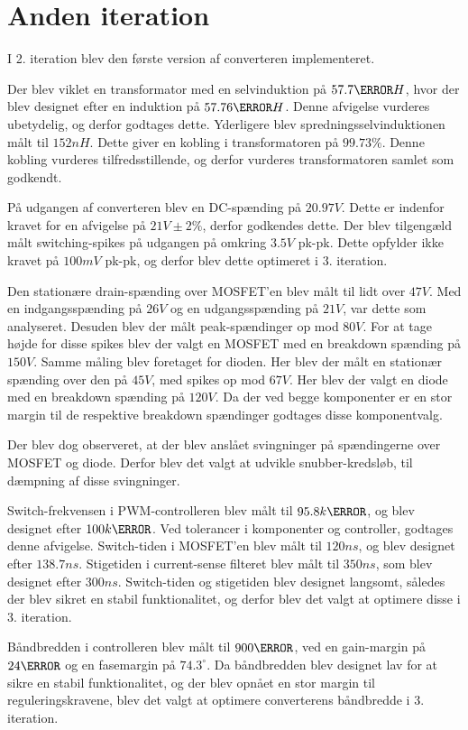 
\section{Anden iteration}
I 2. iteration blev den første version af converteren implementeret.

\noindent Der blev viklet en transformator med en selvinduktion på $57.7\micro H$, hvor der blev designet efter en induktion på $57.76\micro H$. Denne afvigelse vurderes ubetydelig, og derfor godtages dette. Yderligere blev spredningsselvinduktionen målt til $152nH$. Dette giver en kobling i transformatoren på $99.73\percent$. Denne kobling vurderes tilfredsstillende, og derfor vurderes transformatoren samlet som godkendt. 

På udgangen af converteren blev en DC-spænding på $20.97V$. Dette er indenfor kravet for en afvigelse på $21V \pm2\percent$, derfor godkendes dette. Der blev tilgengæld målt switching-spikes på udgangen på omkring $3.5V$ pk-pk. Dette opfylder ikke kravet på $100mV$ pk-pk, og derfor blev dette optimeret i 3. iteration. 

Den stationære drain-spænding over MOSFET'en blev målt til lidt over $47V$. Med en indgangsspænding på $26V$ og en udgangsspænding på $21V$, var dette som analyseret. Desuden blev der målt peak-spændinger op mod $80V$. For at tage højde for disse spikes blev der valgt en MOSFET med en breakdown spænding på $150V$. Samme måling blev foretaget for dioden. Her blev der målt en stationær spænding over den på $45V$, med spikes op mod $67V$. Her blev der valgt en diode med en breakdown spænding på $120V$. Da der ved begge komponenter er en stor margin til de respektive breakdown spændinger godtages disse komponentvalg.

Der blev dog observeret, at der blev anslået svingninger på spændingerne over MOSFET og diode. Derfor blev det valgt at udvikle snubber-kredsløb, til dæmpning af disse svingninger. 

Switch-frekvensen i PWM-controlleren blev målt til $95.8k\hertz$, og blev designet efter $100k\hertz$. Ved tolerancer i komponenter og controller, godtages denne afvigelse. Switch-tiden i MOSFET'en blev målt til $120ns$, og blev designet efter $138.7ns$. Stigetiden i current-sense filteret blev målt til $350ns$, som blev designet efter $300ns$. Switch-tiden og stigetiden blev designet langsomt, således der blev sikret en stabil funktionalitet, og derfor blev det valgt at optimere disse i 3. iteration. 

Båndbredden i controlleren blev målt til $900\hertz$, ved en gain-margin på $24\decibel$ og en fasemargin på $74.3^\circ$. Da båndbredden blev designet lav for at sikre en stabil funktionalitet, og der blev opnået en stor margin til reguleringskravene, blev det valgt at optimere converterens båndbredde i 3. iteration. 

